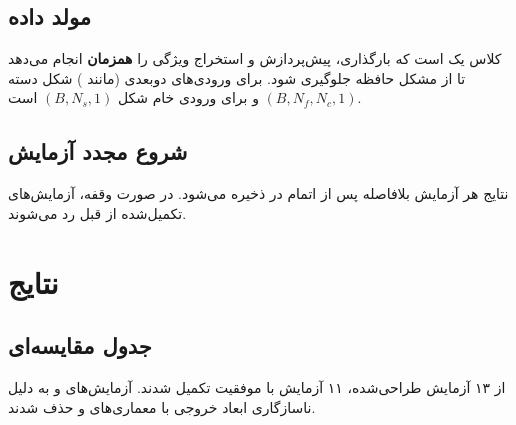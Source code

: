 \documentclass[12pt]{report}
\begin{document}
\section{مولد داده}

کلاس  یک  است که بارگذاری، پیش‌پردازش
و استخراج ویژگی را \textbf{همزمان} انجام می‌دهد تا از مشکل حافظه جلوگیری شود.
برای ورودی‌های دوبعدی (مانند ) شکل دسته $(B, N_f, N_c, 1)$ و
برای ورودی خام شکل $(B, N_s, 1)$ است.

\section{شروع مجدد آزمایش}

نتایج هر آزمایش بلافاصله پس از اتمام در  ذخیره می‌شود.
در صورت وقفه، آزمایش‌های تکمیل‌شده از قبل رد می‌شوند.

\chapter{نتایج}

\section{جدول مقایسه‌ای}

از ۱۳ آزمایش طراحی‌شده، ۱۱ آزمایش با موفقیت تکمیل شدند. آزمایش‌های
 و  به دلیل ناسازگاری ابعاد خروجی 
با معماری‌های  و  حذف شدند.
\end{document}
